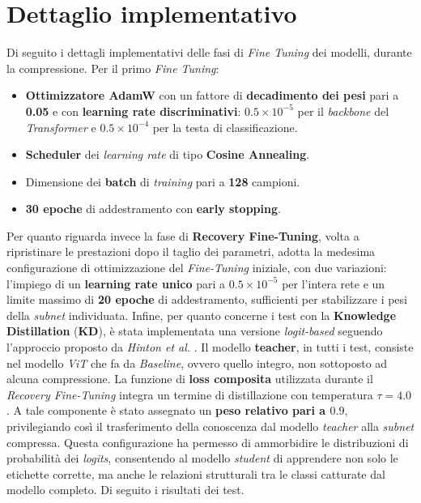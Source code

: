 \section{Dettaglio implementativo}
\label{section:impl}
Di seguito i dettagli implementativi delle fasi di \textit{Fine Tuning} dei
modelli, durante la compressione. Per il primo \textit{Fine Tuning}:
\begin{itemize}
    \item \textbf{Ottimizzatore AdamW} con un fattore di \textbf{decadimento dei pesi} pari a \textbf{0.05} e con \textbf{learning rate discriminativi}: \textbf{$0.5 \times 10^{-5}$} per il \textit{backbone} del \textit{Transformer} e \textbf{$0.5 \times 10^{-4}$} per la testa di classificazione.
    \item \textbf{Scheduler} dei \textit{learning rate} di tipo \textbf{Cosine Annealing}.
    \item Dimensione dei \textbf{batch} di \textit{training} pari a \textbf{128}
          campioni.
    \item \textbf{30 epoche} di addestramento con \textbf{early stopping}.
\end{itemize}
Per quanto riguarda invece la fase di \textbf{Recovery Fine-Tuning}, volta a
ripristinare le prestazioni dopo il taglio dei parametri, adotta la medesima
configurazione di ottimizzazione del \textit{Fine-Tuning} iniziale, con due
variazioni: l'impiego di un \textbf{learning rate unico} pari a \textbf{$0.5
        \times 10^{-5}$} per l'intera rete e un limite massimo di \textbf{20 epoche} di
addestramento, sufficienti per stabilizzare i pesi della \textit{subnet}
individuata. \newline Infine, per quanto concerne i test con la
\textbf{Knowledge Distillation} (\textbf{KD}), è stata implementata una
versione \textit{logit-based} seguendo l'approccio proposto da \textit{Hinton
    et al.} \cite{hinton2015distilling}. Il modello \textbf{teacher}, in tutti i test, consiste nel modello \textit{ViT} che fa da \textit{Baseline}, ovvero quello integro, non sottoposto ad alcuna compressione. La funzione di
\textbf{loss composita} utilizzata durante il \textit{Recovery Fine-Tuning}
integra un termine di distillazione con temperatura \textbf{$\tau = 4.0$}. A
tale componente è stato assegnato un \textbf{peso relativo pari a $0.9$},
privilegiando così il trasferimento della conoscenza dal modello
\textit{teacher} alla \textit{subnet} compressa. Questa configurazione ha
permesso di ammorbidire le distribuzioni di probabilità dei \textit{logits},
consentendo al modello \textit{student} di apprendere non solo le etichette
corrette, ma anche le relazioni strutturali tra le classi catturate dal modello
completo. Di seguito i risultati dei test. \newline

